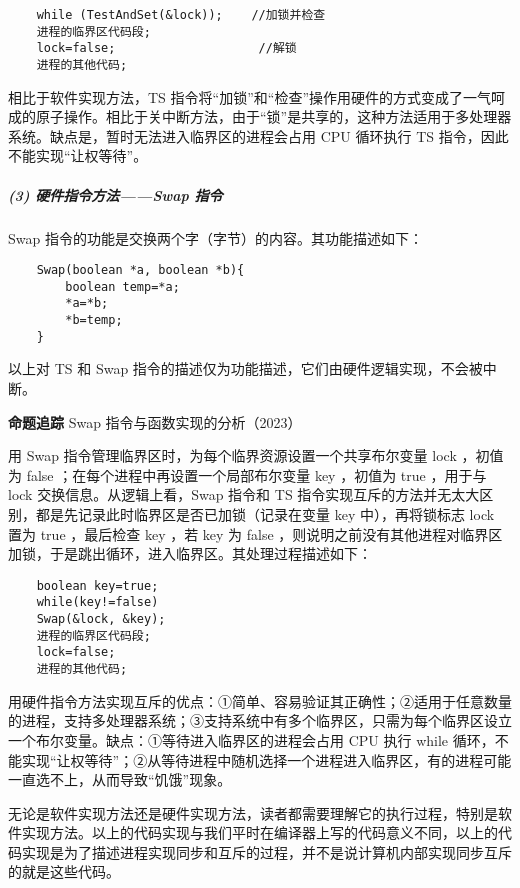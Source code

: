 \documentclass{ctexbook}
\begin{document}
	\begin{lstlisting}
	while (TestAndSet(&lock));    //加锁并检查
	进程的临界区代码段;
	lock=false;                    //解锁
	进程的其他代码;
	\end{lstlisting}

	相比于软件实现方法，TS 指令将“加锁”和“检查”操作用硬件的方式变成了一气呵成的原子操作。相比于关中断方法，由于“锁”是共享的，这种方法适用于多处理器系统。缺点是，暂时无法进入临界区的进程会占用 CPU 循环执行 TS 指令，因此不能实现“让权等待”。
	
	\subparagraph{(3) 硬件指令方法——Swap 指令}
	
	Swap 指令的功能是交换两个字（字节）的内容。其功能描述如下：
	\begin{lstlisting}
	Swap(boolean *a, boolean *b){
		boolean temp=*a;
		*a=*b;
		*b=temp;
	}
\end{lstlisting}

	\begin{tcolorbox}[colback=gray!10, colframe=black!50, title=注意]
		以上对 TS 和 Swap 指令的描述仅为功能描述，它们由硬件逻辑实现，不会被中断。
	\end{tcolorbox}
	
	\textbf{命题追踪} Swap 指令与函数实现的分析（2023）
	
	用 Swap 指令管理临界区时，为每个临界资源设置一个共享布尔变量 lock ，初值为 false ；在每个进程中再设置一个局部布尔变量 key ，初值为 true ，用于与 lock 交换信息。从逻辑上看，Swap 指令和 TS 指令实现互斥的方法并无太大区别，都是先记录此时临界区是否已加锁（记录在变量 key 中），再将锁标志 lock 置为 true ，最后检查 key ，若 key 为 false ，则说明之前没有其他进程对临界区加锁，于是跳出循环，进入临界区。其处理过程描述如下：
	\begin{lstlisting}
	boolean key=true;
	while(key!=false)
	Swap(&lock, &key);
	进程的临界区代码段;
	lock=false;
	进程的其他代码;
\end{lstlisting}

	用硬件指令方法实现互斥的优点：①简单、容易验证其正确性；②适用于任意数量的进程，支持多处理器系统；③支持系统中有多个临界区，只需为每个临界区设立一个布尔变量。缺点：①等待进入临界区的进程会占用 CPU 执行 while 循环，不能实现“让权等待”；②从等待进程中随机选择一个进程进入临界区，有的进程可能一直选不上，从而导致“饥饿”现象。
	
	无论是软件实现方法还是硬件实现方法，读者都需要理解它的执行过程，特别是软件实现方法。以上的代码实现与我们平时在编译器上写的代码意义不同，以上的代码实现是为了描述进程实现同步和互斥的过程，并不是说计算机内部实现同步互斥的就是这些代码。
	
\end{document}

